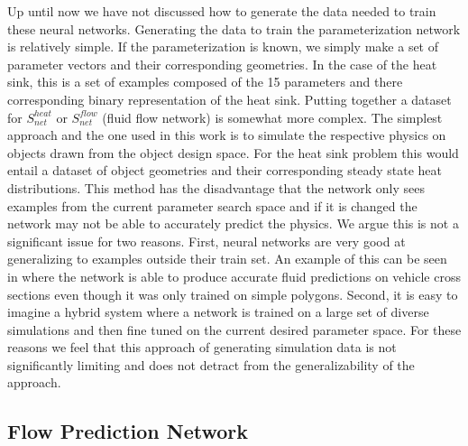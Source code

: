 \documentclass{article} %
\begin{document}
Up until now we have not discussed how to generate the data needed to train these neural networks. Generating the data to train the parameterization network is relatively simple. If the parameterization is known, we simply make a set of parameter vectors and their corresponding geometries. In the case of the heat sink, this is a set of examples composed of the 15 parameters and there corresponding binary representation of the heat sink. Putting together a dataset for $S^{heat}_{net}$ or $S^{flow}_{net}$ (fluid flow network) is somewhat more complex. The simplest approach and the one used in this work is to simulate the respective physics on objects drawn from the object design space. For the heat sink problem this would entail a dataset of object geometries and their corresponding steady state heat distributions. This method has the disadvantage that the network only sees examples from the current parameter search space and if it is changed the network may not be able to accurately predict the physics. We argue this is not a significant issue for two reasons. First, neural networks are very good at generalizing to examples outside their train set. An example of this can be seen in \citet{guo2016convolutional} where the network is able to produce accurate fluid predictions on vehicle cross sections even though it was only trained on simple polygons. Second, it is easy to imagine a hybrid system where a network is trained on a large set of diverse simulations and then fine tuned on the current desired parameter space. For these reasons we feel that this approach of generating simulation data is not significantly limiting and does not detract from the generalizability of the approach.

\subsection{Flow Prediction Network}
\end{document}
